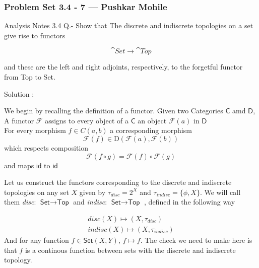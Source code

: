 
\begin{frame}
    \frametitle{Problem Set 3.4 - 7 --- Pushkar Mohile}
    Analysis Notes 3.4 Q.- Show that The discrete and indiscrete topologies on a
    set give rise to functors

\begin{equation}
    \cat{Set}\to \cat{Top}
\end{equation}    
    
    and these are the left and right adjoints, respectively, to the forgetful
    functor from Top to Set. 
\end{frame}
\begin{frame}
    
Solution : 

We begin by recalling the definition of a functor. Given two Categories
\(\textsf{C}\) amd \(\textsf{D}\), A functor \(\mathcal{F} \) assigns to every
object of a \(\textsf{C}\) an object \(\mathcal{F}(a)\) in \(\textsf{D}\) \\
For every morphism \(f \in C(a,b)\) a corresponding morphism 
\begin{equation}
\mathcal{F}(f) \in \text{D}(\mathcal{F}(a), \mathcal{F}(b) )
\end{equation}
which respects composition 
\begin{equation}
    \mathcal{F}(f\circ g) = \mathcal{F}(f) \circ \mathcal{F}(g)
\end{equation}
    and maps \(\textsf{id} \text{ to } \textsf{id}\) 
\end{frame}

\begin{frame}
    
Let us construct the functors corresponding to the discrete and indiscrete
topologies on any set \(X\) given by \(\tau_{disc} = 2^X\) and \(\tau_{indisc} =
\{\phi,X \}\). We will call them \textit{disc}: \(\textsf{Set} \to
\textsf{Top}\) and \textit{indisc}: \(\textsf{Set}\to \textsf{Top}\) , defined
in the following way 

\begin{gather*}
    \textit{disc}(X) \mapsto (X, \tau_{disc}) \\
    \textit{indisc}(X) \mapsto (X,\tau_{indisc}) 
\end{gather*}
And for any function \(f \in \textsf{Set}(X,Y)\), \(f\mapsto f\). 
The check we need to make here is that \(f\) is a continous function between
sets with the discrete and indiscrete topology. 
\end{frame}

